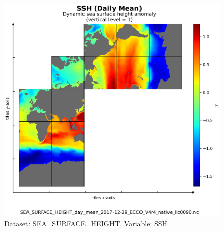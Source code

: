 \begin{longtable}{|m{}|m{}|m{}|m{}|}
\end{longtable}

\begin{figure}[H]
\centering
\includegraphics[scale=0.55]{../images/plots/v4r4/native_plots/Sea_Surface_Height/SSH.png}
\caption{Dataset: SEA\_SURFACE\_HEIGHT, Variable: SSH}
\label{tab:table-SEA_SURFACE_HEIGHT_SSH-Plot}
\end{figure}
\newpage
\pagebreak
